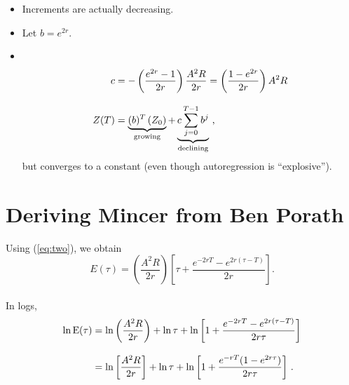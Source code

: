 \documentclass[12pt,compress,handout]{beamer}  %
\begin{document}
\begin{frame}
\begin{itemize}
\item Increments are actually decreasing.\\[5mm]
\item Let $b=e^{2r}$.
\item \ \\[-13mm]
\begin{align*}
c & =-\left( \dfrac{e^{2r}-1}{2r}\right) \dfrac{A^{2}R}{2r}=\left( \dfrac{1-e^{2r}}{2r}\right) A^{2}R\\[3mm]
Z(T) & =\underbrace{(b)^T\,(Z_0)}_\text{growing}+\underbrace{c\sum
_{j=0}^{T-1}b^j}_\text{declining}\text{\,,}
\end{align*}
but converges to a constant (even though autoregression is ``explosive'').
\end{itemize}
\end{frame}


\section[Mincer]{Deriving Mincer from Ben Porath}


\begin{frame}
\small
\begin{center}
    \textbf{\insertsection}
\end{center}

\small

Using (\ref{eq:two}), we obtain
\begin{equation*}
    E(\tau)
    =
    \left( \dfrac{A^2R}{2r}\right)
        \left[ \tau + \dfrac{e^{-2rT}-e^{2r(\tau-T)}}{2r}\right].
\end{equation*}\ \\[4mm]
In logs,
\begin{align*}
\ln \text{E}(\tau )&{}=\ln \left( \frac{A^2R}{2r}\right) +\ln \tau +\ln \left[ 1+\frac{e^{-2rT}-e^{2r(\tau -T)}}{2r\tau }\right] \\[3mm]
&{}=\ln \left[ \frac{A^2R}{2r}\right] +\ln \tau + \ln \left[ 1+\frac{e^{-rT}(1-e^{2r\tau })}{2r\tau }\right] \text{\,.}
\end{align*}
\end{frame}
\end{document}
